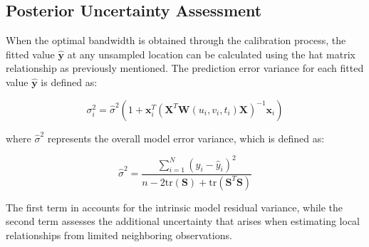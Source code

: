 \subsection{Posterior Uncertainty Assessment}
\label{subsec:gtwr_prediction}

When the optimal bandwidth is obtained through the calibration process, the fitted value $\hat{\mathbf{y}}$ at any unsampled location can be calculated using the hat matrix relationship as previously mentioned. The prediction error variance for each fitted value $\hat{\mathbf{y}}$ is defined as:

\begin{equation}
	\sigma_i^2 = \hat{\sigma}^2 \left(1 + \mathbf{x}_i^T (\mathbf{X}^T \mathbf{W}(u_i, v_i, t_i) \mathbf{X})^{-1} \mathbf{x}_i \right)
	\label{eq:gtwr_variance}
\end{equation}

\noindent where $\hat{\sigma}^2$ represents the overall model error variance, which is defined as:

\begin{equation}
	\hat{\sigma}^2 = \frac{\sum_{i=1}^{N} (y_i - \hat{y}_i)^2}{n - 2\text{tr}(\mathbf{S}) + \text{tr}(\mathbf{S}^T \mathbf{S})}
	\label{eq:model_error_variance}
\end{equation}

The first term in  accounts for the intrinsic model residual variance, while the second term assesses the additional uncertainty that arises when estimating local relationships from limited neighboring observations.


